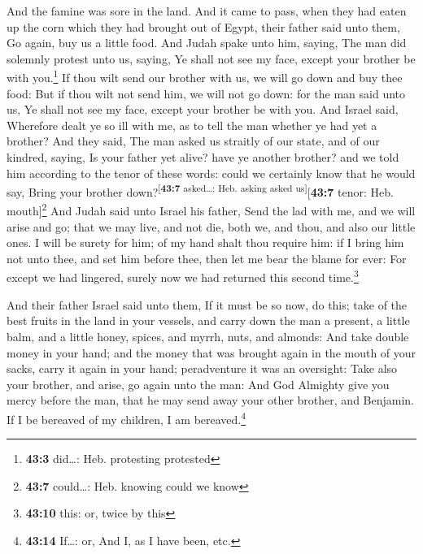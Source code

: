  And the famine was sore in the land.  And
it came to pass, when they had eaten up the corn which they had brought
out of Egypt, their father said unto them, Go again, buy us a little
food.  And Judah spake unto him, saying, The man did
solemnly protest unto us, saying, Ye shall not see my face, except your
brother be with you.\footnote{\textbf{43:3} did\ldots: Heb. protesting
  protested}  If thou wilt send our brother with us, we
will go down and buy thee food:  But if thou wilt not send
him, we will not go down: for the man said unto us, Ye shall not see my
face, except your brother be with you.  And Israel said,
Wherefore dealt ye so ill with me, as to tell the man whether ye had yet
a brother?  And they said, The man asked us straitly of
our state, and of our kindred, saying, Is your father yet alive? have ye
another brother? and we told him according to the tenor of these words:
could we certainly know that he would say, Bring your brother
down?\textsuperscript{{[}\textbf{43:7} asked\ldots: Heb. asking asked
us{]}}{[}\textbf{43:7} tenor: Heb. mouth{]}\footnote{\textbf{43:7}
  could\ldots: Heb. knowing could we know}  And Judah said
unto Israel his father, Send the lad with me, and we will arise and go;
that we may live, and not die, both we, and thou, and also our little
ones.  I will be surety for him; of my hand shalt thou
require him: if I bring him not unto thee, and set him before thee, then
let me bear the blame for ever:  For except we had
lingered, surely now we had returned this second time.\footnote{\textbf{43:10}
  this: or, twice by this}

 And their father Israel said unto them, If it must be so
now, do this; take of the best fruits in the land in your vessels, and
carry down the man a present, a little balm, and a little honey, spices,
and myrrh, nuts, and almonds:  And take double money in
your hand; and the money that was brought again in the mouth of your
sacks, carry it again in your hand; peradventure it was an oversight:
 Take also your brother, and arise, go again unto the
man:  And God Almighty give you mercy before the man,
that he may send away your other brother, and Benjamin. If I be bereaved
of my children, I am bereaved.\footnote{\textbf{43:14} If\ldots: or, And
  I, as I have been, etc.}

